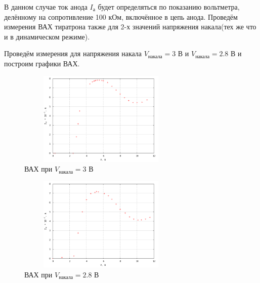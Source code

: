 \documentclass[12pt]{article}
\begin{document}
	В данном случае ток анода $I_\text{а}$ будет определяться по показанию вольтметра, делённому на сопротивление 100 кОм, включённое в цепь анода. Проведём измерения ВАХ тиратрона также для 2-х значений напряжения накала(тех же что и в динамическом режиме).
\par
	Проведём измерения для напряжения накала $V_\text{накала} = 3$ В и $V_\text{накала} = 2.8$ В и построим графики ВАХ.
\begin{figure}[h!]
	\centering
	\includegraphics[width = 8cm, height= 4.5cm]{plot1.png}
	\caption{ВАХ при $V_\text{накала} = 3$ В}
\end{figure}
\begin{figure}[h!]
	\centering
	\includegraphics[width = 8cm, height= 4.5cm]{plot2.png}
	\caption{ВАХ при $V_\text{накала} = 2.8$ В}
\end{figure}
\end{document}
